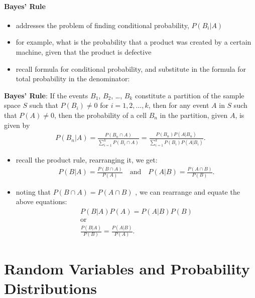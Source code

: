 \documentclass[10pt]{article}
\begin{document}
\subsection{Bayes' Rule}
\begin{itemize}
    \item addresses the problem of finding conditional probability, $P(B_i|A)$
    \item for example, what is the probability that a product was created by a certain machine, given that the product is defective
    \item recall formula for conditional probability, and substitute in the formula for total probability in the denominator:
\end{itemize}
\begin{theorem}
    \textbf{Bayes' Rule}: If the events $B_1$, $B_2$, \ldots, $B_k$ constitute a partition of the sample space $S$ such that $P(B_i) \neq 0$ for $i = 1, 2, \ldots, k$, then for any event $A$ in $S$ such that $P(A) \neq 0$, then the probability of a cell $B_n$ in the partition, given $A$, is given by 
    \begin{align*}
        P(B_n|A) = \frac{P(B_n \cap A)}{\sum_{i=1}^{k} P(B_i \cap A)} = \frac{P(B_n)P(A|B_n)}{\sum_{i=1}^{k} P(B_i)P(A|B_i)}
    .\end{align*}
\end{theorem}
\begin{itemize}
    \item recall the product rule, rearranging it, we get:
        \begin{align*}
            P(B|A) = \frac{P(B \cap A)}{P(A)} \quad \text{and} \quad P(A|B) = \frac{P(A \cap B)}{P(B)}
        .\end{align*}
    \item noting that $P(B \cap A) = P(A \cap B)$ , we can rearrange and equate the above equations:
        \begin{gather*}
            P(B|A)P(A) = P(A|B)P(B) \\ 
            \text{or} \\ 
            \frac{P(B|A)}{P(B)} = \frac{P(A|B)}{P(A)}
        .\end{gather*}
\end{itemize}


\newpage

\part{Random Variables and Probability Distributions}
\end{document}
